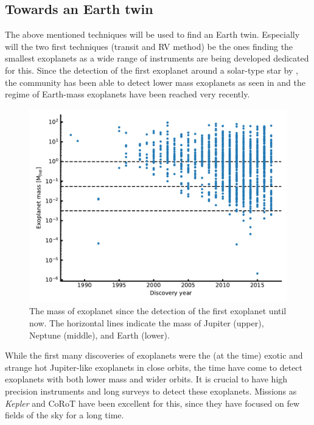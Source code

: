 \subsection{Towards an Earth twin}

The above mentioned techniques will be used to find an Earth twin. Especially will the two first
techniques (transit and RV method) be the ones finding the smallest exoplanets as a wide range of
instruments are being developed dedicated for this. Since the detection of the first exoplanet
around a solar-type star by \citet{Mayor1995}, the community has been able to detect lower mass
exoplanets as seen in  and the regime of Earth-mass exoplanets have been
reached very recently.

\begin{figure}[htpb!]
    \centering
    \includegraphics[width=0.8\linewidth]{figures/exoplanetMass.pdf}
    \caption{The mass of exoplanet since the detection of the first exoplanet until now. The
             horizontal lines indicate the mass of Jupiter (upper), Neptune (middle), and Earth
             (lower).}
    \label{fig:exoplanetMass}
\end{figure}

While the first many discoveries of exoplanets were the (at the time) exotic and strange hot
Jupiter-like exoplanets in close orbits, the time have come to detect exoplanets with both lower
mass and wider orbits. It is crucial to have high precision instruments and long surveys to detect
these exoplanets. Missions as \emph{Kepler} and CoRoT have been excellent for this, since they have
focused on few fields of the sky for a long time.

